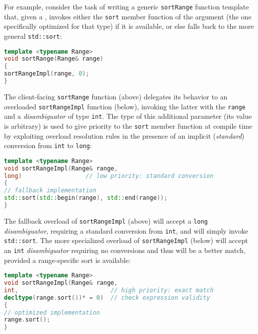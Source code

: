 For example, consider the task of writing a generic \lstinline!sortRange!
function template that, given a , invokes either the
\lstinline!sort! member function of the argument (the one specifically
optimized for that type) if it is available, or else falls back to the more
general \lstinline!std::sort!:

\begin{lstlisting}[language=C++]
template <typename Range>
void sortRange(Range& range)
{
sortRangeImpl(range, 0);
}
\end{lstlisting}

\noindent The client-facing \lstinline!sortRange! function (above) delegates its
behavior to an overloaded \lstinline!sortRangeImpl! function (below),
invoking the latter with the \lstinline!range! and a \emph{disambiguator}
of type \lstinline!int!. The type of this additional parameter (its value
is arbitrary) is used to give priority to the \lstinline!sort! member
function at compile time by exploiting overload resolution rules in
the presence of an implicit (\emph{standard}) conversion from
\lstinline!int! to \lstinline!long!:

\begin{lstlisting}[language=C++]
template <typename Range>
void sortRangeImpl(Range& range,
long)                  // low priority: standard conversion
{
// fallback implementation
std::sort(std::begin(range), std::end(range));
}
\end{lstlisting}

\noindent The fallback overload of \lstinline!sortRangeImpl! (above) will accept a
\lstinline!long! \emph{disambiguator}, requiring a standard conversion from
\lstinline!int!, and will simply invoke \lstinline!std::sort!. The more
specialized overload of \lstinline!sortRangeImpl! (below) will accept an
\lstinline!int! \emph{disambiguator} requiring no conversions and thus
will be a better match, provided a range-specific sort is available:

\begin{lstlisting}[language=C++]
template <typename Range>
void sortRangeImpl(Range& range,
int,                          // high priority: exact match
decltype(range.sort())* = 0)  // check expression validity
{
// optimized implementation
range.sort();
}
\end{lstlisting}

